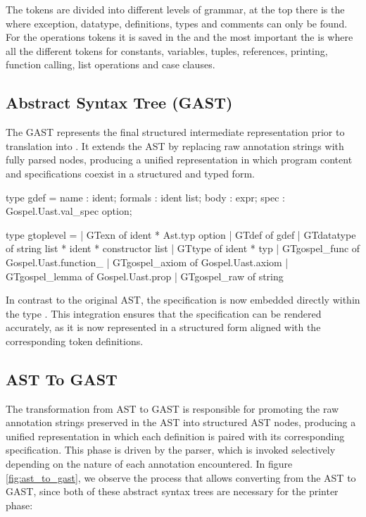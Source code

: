 The tokens are divided into different levels of grammar, at the top there is the  where exception, datatype, definitions, types
and \gospel comments can only be found. For the operations tokens it is saved in the  and the most important the  is where all 
the different tokens for constants, variables, tuples, references, printing, function calling, list operations and case clauses.

\subsection{\gospel Abstract Syntax Tree (GAST)}
\label{subsec:GAST}

The GAST represents the final structured intermediate representation prior to translation into \whyml. It extends the AST by replacing raw \gospel 
annotation strings with fully parsed \gospel nodes, producing a unified representation in which \cml program content and \gospel specifications 
coexist in a structured and typed form.

\begin{ocamlenv}
    type gdef = {
    name    : ident; 
    formals : ident list; 
    body    : expr;
    spec    : Gospel.Uast.val_spec option;
    }

    type gtoplevel = 
    | GTexn          of ident * Ast.typ option
    | GTdef          of gdef
    | GTdatatype     of string list * ident * constructor list
    | GTtype         of ident * typ
    | GTgospel_func  of Gospel.Uast.function_
    | GTgospel_axiom of Gospel.Uast.axiom
    | GTgospel_lemma of Gospel.Uast.prop
    | GTgospel_raw   of string
\end{ocamlenv}

In contrast to the original AST, the \gospel specification is now embedded directly within the type . This integration ensures 
that the specification can be rendered accurately, as it is now represented in a structured form aligned with the corresponding token definitions.

\subsection{AST To GAST}
\label{subsec:AST_to_GAST}

The transformation from AST to GAST is responsible for promoting the raw \gospel annotation strings preserved in the AST into structured \gospel AST nodes, 
producing a unified representation in which each \cml definition is paired with its corresponding specification. This phase is driven by the \gospel parser, 
which is invoked selectively depending on the nature of each annotation encountered. In figure \ref{fig:ast_to_gast}, we observe the process that allows
converting from the AST to GAST, since both of these abstract syntax trees are necessary for the printer phase:

